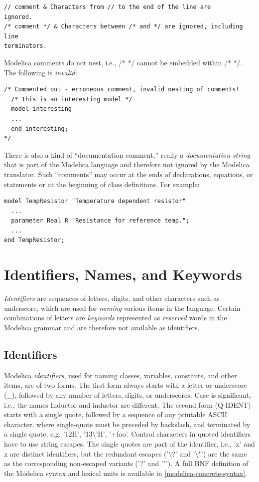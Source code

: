 \documentclass[10pt,a4paper]{report}
\def\doublelabel#1{\label{#1}\hypertarget{#1}{}}
\begin{document}
\begin{lstlisting}[language=modelica]
// comment & Characters from // to the end of the line are
ignored.
/* comment */ & Characters between /* and */ are ignored, including line
terminators.
\end{lstlisting}

Modelica comments do not nest, i.e., /* */ cannot be embedded within /*
*/. The following is \emph{invalid}:
\begin{lstlisting}[language=modelica]
/* Commented out - erroneous comment, invalid nesting of comments!
  /* This is an interesting model */
  model interesting
  ...
  end interesting;
*/
\end{lstlisting}

There is also a kind of ``documentation comment,'' really a
\emph{documentation string} that is part of the Modelica language and
therefore not ignored by the Modelica translator. Such ``comments'' may
occur at the ends of declarations, equations, or statements or at the
beginning of class definitions. For example:

\begin{lstlisting}[language=modelica]
model TempResistor "Temperature dependent resistor"
  ...
  parameter Real R "Resistance for reference temp.";
  ...
end TempResistor;
\end{lstlisting}

\section{Identifiers, Names, and Keywords}\doublelabel{identifiers-names-and-keywords}

\emph{Identifiers} are sequences of letters, digits, and other
characters such as underscore, which are used for \emph{naming} various
items in the language. Certain combinations of letters are
\emph{keywords} represented as \emph{reserved} words in the Modelica
grammar and are therefore not available as identifiers.

\subsection{Identifiers}\doublelabel{identifiers}

Modelica \emph{identifiers}, used for naming classes, variables,
constants, and other items, are of two forms. The first form always
starts with a letter or underscore (\_), followed by any number of
letters, digits, or underscores. Case is significant, i.e., the names
Inductor and inductor are different. The second form (Q-IDENT) starts
with a single quote, followed by a sequence of any printable ASCII
character, where single-quote must be preceded by backslash, and
terminated by a single quote, e.g. '12H', '13\textbackslash{}'H',
'+foo'. Control characters in quoted identifiers have to use string
escapes. The single quotes are part of the identifier, i.e., 'x' and x
are distinct identifiers, but the redundant escapes ('\textbackslash{}?'
and '\textbackslash{}"') are the same as the corresponding non-escaped
variants ('?' and '"'). A full BNF definition of the Modelica syntax and
lexical units is available in \ref{modelica-concrete-syntax}.
\end{document}
